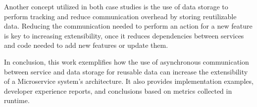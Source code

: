 Another concept utilized in both case studies is the use of data storage to perform tracking and reduce communication overhead by storing reutilizable data. Reducing the communication needed to perform an action for a new feature is key to increasing extensibility, once it reduces dependencies between services and code needed to add new features or update them.

In conclusion, this work exemplifies how the use of asynchronous communication between service and data storage for reusable data can increase the extensibility of a Microservice system's architecture. It also provides implementation examples, developer experience reports, and conclusions based on metrics collected in runtime.
